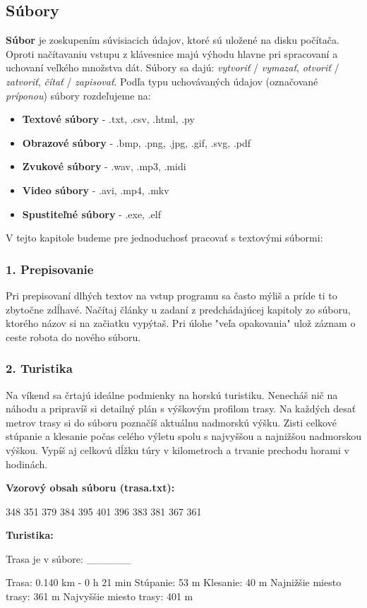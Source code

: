 

\subsection{Súbory}
\textbf{Súbor} je zoskupením súvisiacich údajov, ktoré sú uložené na disku počítača. Oproti načítavaniu vstupu z klávesnice majú výhodu hlavne pri spracovaní a uchovaní veľkého množstva dát. Súbory sa dajú: \textit{vytvoriť} / \textit{vymazať}, \textit{otvoriť} / \textit{zatvoriť}, \textit{čítať} / \textit{zapisovať}. Podľa typu uchovávaných údajov (označované \textit{príponou}) súbory rozdeľujeme na:

\begin{itemize}
\itemsep0pt
\item \textbf{Textové súbory} - .txt, .csv, .html, .py
\item \textbf{Obrazové súbory} - .bmp, .png, .jpg, .gif, .svg, .pdf
\item \textbf{Zvukové súbory} - .wav, .mp3, .midi
\item \textbf{Video súbory} - .avi, .mp4, .mkv
\item \textbf{Spustiteľné súbory} - .exe, .elf
\end{itemize}

V tejto kapitole budeme pre jednoduchosť pracovať s textovými súbormi:

\subsubsection*{1. Prepisovanie}
Pri prepisovaní dlhých textov na vstup programu sa často mýliš a príde ti to zbytočne zdĺhavé. Načítaj články u zadaní z predchádajúcej kapitoly zo súboru, ktorého názov si na začiatku vypýtaš. Pri úlohe "veľa opakovania" ulož záznam o ceste robota do nového súboru.


\subsubsection*{2. Turistika}
Na víkend sa črtajú ideálne podmienky na horskú turistiku. Nenecháš nič na náhodu a pripravíš si detailný plán s výškovým profilom trasy. Na každých desať metrov trasy si do súboru poznačíš aktuálnu nadmorskú výšku. Zisti celkové stúpanie a klesanie počas celého výletu spolu s najvyššou a najnižšou nadmorskou výškou. Vypíš aj celkovú dĺžku túry v kilometroch a trvanie prechodu horami v hodinách.

\begin{minipage}{.35\textwidth}
\textbf{Vzorový obsah súboru (trasa.txt):}
\begin{code}
348
351
379
384
395
401
396
383
381
367
361
\end{code}
\end{minipage}
\hfill
\begin{minipage}{.45\textwidth}
\textbf{Turistika:}
\begin{code}
Trasa je v súbore: ______

Trasa: 0.140 km - 0 h 21 min
Stúpanie: 53 m
Klesanie: 40 m
Najnižšie miesto trasy: 361 m
Najvyššie miesto trasy: 401 m
\end{code}
\end{minipage}

